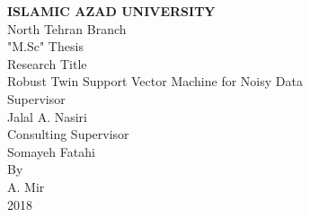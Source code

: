 
\thispagestyle{empty}

\begin{center}
	
	\begin{latin}
		
		{\LARGE \bf ISLAMIC AZAD UNIVERSITY}
		\\[1cm]
		{\Large North Tehran Branch}
		\\[1cm]
		{\Large "M.Sc" Thesis}
		\\[2cm]
		
		{\Large Research Title}
		\\[.5cm]
		{ Robust Twin Support Vector Machine for Noisy Data}
		\\[1cm]
		{\Large Supervisor}
		\\[.5cm]
		{Jalal A. Nasiri}
		\\[1cm]
		{\Large Consulting Supervisor}
		\\[.5cm]
		{Somayeh Fatahi}
		\\[1cm]
		{\Large By}
		\\[.5cm]
		{A. Mir}
		\\[1cm]
		2018
		
	\end{latin}
\end{center}
